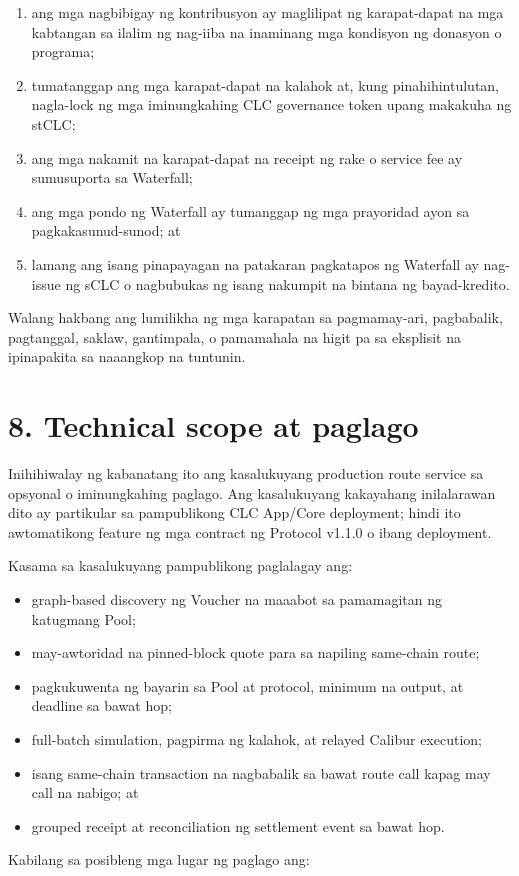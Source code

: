 \documentclass[11pt]{article}
\begin{document}
\begin{enumerate}[leftmargin=*]
\item ang mga nagbibigay ng kontribusyon ay maglilipat ng karapat-dapat na mga kabtangan sa ilalim ng nag-iiba na inaminang mga kondisyon ng donasyon o programa;
\item tumatanggap ang mga karapat-dapat na kalahok at, kung pinahihintulutan, nagla-lock ng mga iminungkahing CLC governance token upang makakuha ng stCLC;
\item ang mga nakamit na karapat-dapat na receipt ng rake o service fee ay sumusuporta sa Waterfall;
\item ang mga pondo ng Waterfall ay tumanggap ng mga prayoridad ayon sa pagkakasunud-sunod; at
\item lamang ang isang pinapayagan na patakaran pagkatapos ng Waterfall ay nag-issue ng sCLC o nagbubukas ng isang nakumpit na bintana ng bayad-kredito.
\end{enumerate}
Walang hakbang ang lumilikha ng mga karapatan sa pagmamay-ari, pagbabalik, pagtanggal, saklaw, gantimpala, o pamamahala na higit pa sa eksplisit na ipinapakita sa naaangkop na tuntunin.


\section*{8. Technical scope at paglago}

Inihihiwalay ng kabanatang ito ang kasalukuyang production route service sa opsyonal o iminungkahing paglago. Ang kasalukuyang kakayahang inilalarawan dito ay partikular sa pampublikong CLC App/Core deployment; hindi ito awtomatikong feature ng mga contract ng Protocol v1.1.0 o ibang deployment.

Kasama sa kasalukuyang pampublikong paglalagay ang:

\begin{itemize}[leftmargin=*]
\item graph-based discovery ng Voucher na maaabot sa pamamagitan ng katugmang Pool;
\item may-awtoridad na pinned-block quote para sa napiling same-chain route;
\item pagkukuwenta ng bayarin sa Pool at protocol, minimum na output, at deadline sa bawat hop;
\item full-batch simulation, pagpirma ng kalahok, at relayed Calibur execution;
\item isang same-chain transaction na nagbabalik sa bawat route call kapag may call na nabigo; at
\item grouped receipt at reconciliation ng settlement event sa bawat hop.
\end{itemize}
Kabilang sa posibleng mga lugar ng paglago ang:
\end{document}
